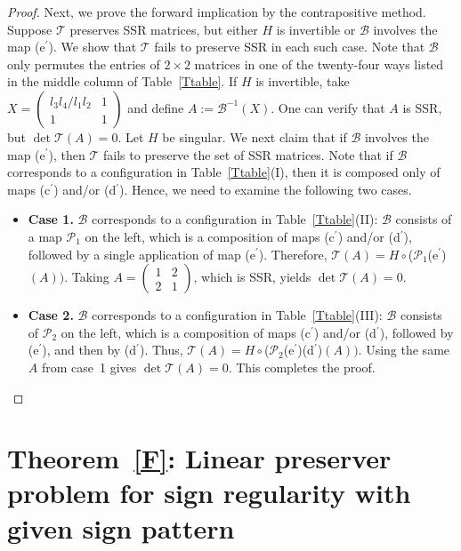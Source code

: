 \documentclass[11pt,reqno]{amsart}
\theoremstyle{plain}
\theoremstyle{definition}
\numberwithin{equation}{section}
\begin{document}
\begin{proof}
	Next, we prove the forward implication by the contrapositive method. Suppose $\mathcal{T}$ preserves SSR matrices, but either $H$ is invertible or $\mathcal{B}$ involves the map (e$^{\prime}$). We show that $\mathcal{T}$ fails to preserve SSR in each such case. Note that $\mathcal{B}$ only permutes the entries of $2\times2$ matrices in one of the twenty-four ways listed in the middle column of Table~\ref{Ttable}. If $H$ is invertible, take $X=\begin{pmatrix}
		l_3l_4/l_1l_2 & 1 \\
		1 & 1
	\end{pmatrix}$ and define $A:=\mathcal{B}^{-1}(X)$. One can verify that $A$ is SSR, but $\det\mathcal{T}(A)=0$. Let $H$ be singular. We next claim that if $\mathcal{B}$ involves the map (e$^{\prime}$), then $\mathcal{T}$ fails to preserve the set of SSR matrices. Note that if $\mathcal{B}$ corresponds to a configuration in Table~\ref{Ttable}(I), then it is composed only of maps (c$^{\prime}$) and/or (d$^{\prime}$). Hence, we need to examine the following two cases.
	
	\begin{itemize}[leftmargin=0pt,label={}]
		\item \textbf{Case 1.} $\mathcal{B}$ corresponds to a configuration in Table~\ref{Ttable}(II): $\mathcal{B}$ consists of a map $\mathcal{P}_1$ on the left, which is a composition of maps (c$^{\prime}$) and/or (d$^{\prime}$), followed by a single application of map (e$^{\prime}$). Therefore, $\mathcal{T}(A)=H\circ$($\mathcal{P}_1$(e$^{\prime}$)$(A))$. Taking $A=\begin{pmatrix}
			1 & 2 \\
			2 & 1
		\end{pmatrix}$, which is SSR, yields $\det \mathcal{T}(A)=0$.
		
		\item \textbf{Case 2.} $\mathcal{B}$ corresponds to a configuration in Table~\ref{Ttable}(III): $\mathcal{B}$ consists of $\mathcal{P}_2$ on the left, which is a composition of maps (c$^{\prime}$) and/or (d$^{\prime}$), followed by (e$^{\prime}$), and then by (d$^{\prime}$). Thus, $\mathcal{T}(A) = H\circ$($\mathcal{P}_2$(e$^{\prime}$)(d$^{\prime}$)$(A))$. Using the same $A$ from case~1 gives $\det\mathcal{T}(A)=0$. This completes the proof. \qedhere
	\end{itemize}
\end{proof}

\section{Theorem~\ref{F}: Linear preserver problem for sign regularity with given sign pattern} \label{section SR_epsilon}
\end{document}
